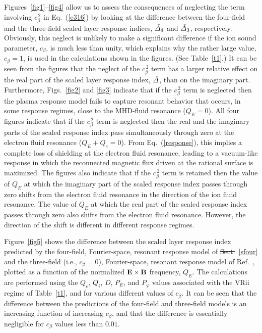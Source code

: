 \documentclass[12pt,prb,aps]{revtex4-1}
\providecommand{\DIFadd}[1]{{\protect\color{blue}\uwave{#1}}} %
\providecommand{\DIFdel}[1]{{\protect\color{red}\sout{#1}}}                      %
\providecommand{\DIFaddbegin}{} %
\providecommand{\DIFaddend}{} %
\providecommand{\DIFdelbegin}{} %
\providecommand{\DIFdelend}{} %
\begin{document}
Figures~\ref{fig1}--\ref{fig4} allow us to assess the consequences of neglecting the term involving $c_\beta^{\,2}$ in Eq.~(\ref{e316}) by looking
at the difference between the four-field and the three-field scaled layer response indices,  $\hat{\mit\Delta}_4$ and $\hat{\mit\Delta}_3$, respectively. 
Obviously, this neglect is unlikely  to make a significant difference if the ion sound parameter, $c_\beta$, is much less than unity, which explains
why the rather large value, $c_\beta=1$, is used in the calculations shown in the figures. (See Table~\ref{t1}.) It can be seen from the figures that
the neglect of the $c_\beta^{\,2}$ term has a larger relative effect on the real part of the scaled layer response index, $\hat{\mit\Delta}$,  than on the imaginary part.
Furthermore, Figs.~\ref{fig2} and \ref{fig3} indicate that if the $c_\beta^{\,2}$ term is neglected then the plasma response model fails to capture resonant behavior
that occurs, in some response regimes,  close to the MHD-fluid resonance ($Q_E=0$). All four figures indicate that if the $c_\beta^{\,2}$ term is neglected then the real and the imaginary parts
of the scaled response index pass simultaneously through zero  at the electron fluid resonance ($Q_E+Q_e=0$). From Eq.~(\ref{response}), this implies a
complete loss of shielding at the electron fluid resonance, leading to a vacuum-like response in which the reconnected magnetic flux
driven at the rational surface is maximized. The figures also indicate that if the $c_\beta^{\,2}$ term is retained then 
the value of $Q_E$  at which the imaginary part of the scaled response index passes through zero shifts from the electron fluid
resonance in the direction of the ion fluid resonance.\cite{lee} The value of $Q_E$ at which the real part of the scaled response index passes through zero also shifts from the electron fluid resonance. However, the direction of the shift is different in different response regimes.

Figure~\ref{fig5} shows the difference between the scaled layer response index predicted by the 
four-field, Fourier-space, resonant response model of \DIFdelbegin \DIFdel{Sect.}\DIFdelend \DIFaddbegin \DIFadd{Appendix}\DIFaddend ~\ref{sfour} and the  three-field (i.e., $c_\beta=0$), Fourier-space,  resonant response model of Ref.~, plotted
as a function of the normalized ${\bf E}\times {\bf B}$ frequency, $Q_E$. The calculations are performed using the $Q_e$, $Q_i$, $D$, $P_E$,
and $P_\varphi$ values associated with the VRii regime of Table~\ref{t1}, and for various different values of $c_\beta$.  It can be seen that the
difference between the predictions of the four-field and three-field  models is an increasing function of increasing $c_\beta$, and that the difference is essentially
negligible for $c_\beta$ values less than $0.01$.
\end{document}
